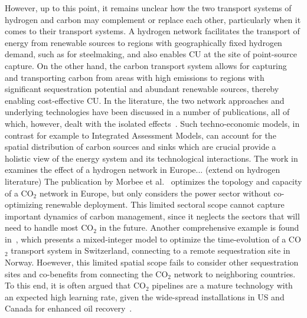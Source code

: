 \documentclass[twocolumn]{article}
\newcommand{\carbon}{CO$_2$}
\begin{document}
However, up to this point, it remains unclear how the two transport systems of hydrogen and carbon may complement or replace each other, particularly when it comes to their transport systems. A hydrogen network facilitates the transport of energy from renewable sources to regions with geographically fixed hydrogen demand, such as for steelmaking, and also enables CU at the site of point-source capture. On the other hand, the carbon transport system allows for capturing and transporting carbon from areas with high emissions to regions with significant sequestration potential and abundant renewable sources, thereby enabling cost-effective CU.
In the literature, the two network approaches and underlying technologies have been discussed in a number of publications, all of which, however, dealt with the isolated effects~\cite{bakkenLinearModelsOptimization2008,morbeeOptimisedDeploymentEuropean2012,stewartFeasibilityEuropeanwideIntegrated2014,oeiModelingCarbonCapture2014,elahiMultiperiodLeastCost2014,burandtDecarbonizingChinaEnergy2019,middletonSimCCSOpensourceTool2020,bjerketvedtOptimalDesignCost2020,weiProposedGlobalLayout2021,damoreOptimalDesignEuropean2021,becattiniCarbonDioxideCapture2022}. Such techno-economic models, in contrast for example to Integrated Assessment Models, can account for the spatial distribution of carbon sources and sinks which are crucial provide a holistic view of the energy system and its technological interactions. The work in~\cite{neumannBenefitsHydrogenNetwork2022} examines the effect of a hydrogen network in Europe... (extend on hydrogen literature)
The publication by Morbee et al.~\cite{morbeeOptimisedDeploymentEuropean2012} optimizes the topology and capacity of a \carbon{} network in Europe, but only considers the power sector without co-optimizing renewable deployment. This limited sectoral scope cannot capture important dynamics of carbon management, since it neglects the sectors that will need to handle most \carbon{} in the future.
Another comprehensive example is found in~\cite{becattiniCarbonDioxideCapture2022}, which presents a mixed-integer model to optimize the time-evolution of a \carbon{} transport system in Switzerland, connecting to a remote sequestration site in Norway. Hoewever, this limited spatial scope fails to consider other sequestration sites and co-benefits from connecting the \carbon{} network to neighboring countries. To this end, it is often argued that \carbon{} pipelines are a mature technology with an expected high learning rate, given the wide-spread installations in US and Canada for enhanced oil recovery~\cite{righettiSitingCarbonDioxide2017,friedmannNETZEROGEOSPHERICRETURN}.
\end{document}
